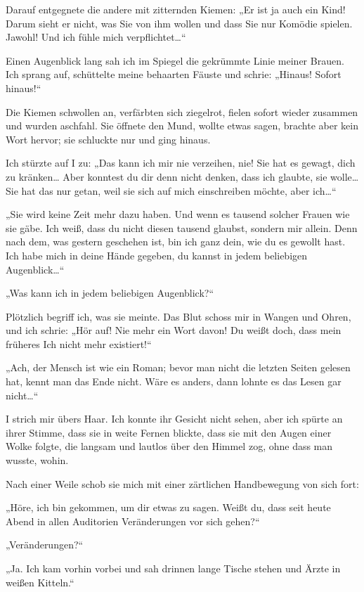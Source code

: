 Darauf entgegnete die andere mit zitternden Kiemen: „Er ist ja auch
ein Kind! Darum sieht er nicht, was Sie von ihm wollen und dass Sie
nur Komödie spielen. Jawohl! Und ich fühle mich verpflichtet\ldots{}“

Einen Augenblick lang sah ich im Spiegel die gekrümmte Linie meiner
Brauen. Ich sprang auf, schüttelte meine behaarten Fäuste und
schrie: „Hinaus! Sofort hinaus!“

Die Kiemen schwollen an, verfärbten sich ziegelrot, fielen sofort
wieder zusammen und wurden aschfahl. Sie öffnete den Mund, wollte
etwas sagen, brachte aber kein Wort hervor; sie schluckte nur und
ging hinaus.

Ich stürzte auf I zu: „Das kann ich mir nie verzeihen,
nie! Sie hat es gewagt, dich zu kränken\ldots{} Aber konntest du dir
denn nicht denken, dass ich glaubte, sie wolle\ldots{} Sie hat das nur
getan, weil sie sich auf mich einschreiben möchte, aber ich\ldots{}“

„Sie wird keine Zeit mehr dazu haben. Und wenn es tausend solcher
Frauen wie sie gäbe. Ich weiß, dass du nicht diesen tausend
glaubst, sondern mir allein. Denn nach dem, was gestern geschehen
ist, bin ich ganz dein, wie du es gewollt hast. Ich habe mich in
deine Hände gegeben, du kannst in jedem beliebigen Augenblick\ldots{}“

„Was kann ich in jedem beliebigen Augenblick?“

Plötzlich begriff
ich, was sie meinte. Das Blut schoss mir in Wangen und Ohren, und
ich schrie: „Hör auf! Nie mehr ein Wort davon! Du weißt doch, dass
mein früheres Ich nicht mehr existiert!“

„Ach, der Mensch ist wie
ein Roman; bevor man nicht die letzten Seiten gelesen hat, kennt
man das Ende nicht. Wäre es anders, dann lohnte es das Lesen gar
nicht\ldots{}“

I strich mir übers Haar. Ich konnte ihr Gesicht nicht sehen, aber
ich spürte an ihrer Stimme, dass sie in weite Fernen blickte, dass
sie mit den Augen einer Wolke folgte, die langsam und lautlos über
den Himmel zog, ohne dass man wusste, wohin.

Nach einer Weile schob sie mich mit einer zärtlichen Handbewegung
von sich fort:

„Höre, ich bin gekommen, um dir etwas zu sagen. Weißt du, dass seit
heute Abend in allen Auditorien Veränderungen vor sich gehen?“

„Veränderungen?“

„Ja. Ich kam vorhin vorbei und sah drinnen lange Tische stehen und
Ärzte in weißen Kitteln.“

